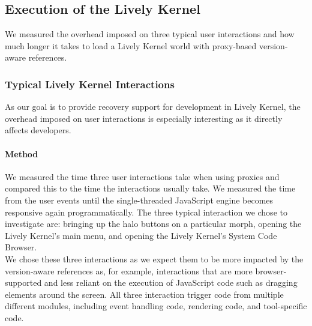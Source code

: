 


\subsection{Execution of the Lively Kernel}

We measured the overhead imposed on three typical user interactions and how much longer it takes to load a Lively Kernel world with proxy-based version-aware references.

\subsubsection{Typical Lively Kernel Interactions}

As our goal is to provide recovery support for development in Lively Kernel, the overhead imposed on user interactions is especially interesting as it directly affects developers.

\paragraph{Method}
We measured the time three user interactions take when using proxies and compared this to the time the interactions usually take.
We measured the time from the user events until the single-threaded JavaScript engine becomes responsive again programmatically.
The three typical interaction we chose to investigate are: bringing up the halo buttons on a particular morph, opening the Lively Kernel's main menu, and opening the Lively Kernel's System Code Browser.\\
We chose these three interactions as we expect them to be more impacted by the version-aware references as, for example, interactions that are more browser-supported and less reliant on the execution of JavaScript code such as dragging elements around the screen.
All three interaction trigger code from multiple different modules, including event handling code, rendering code, and tool-specific code.

